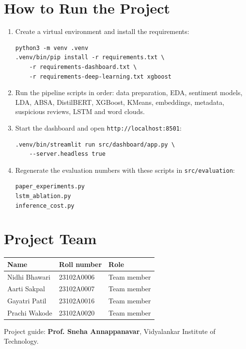 \documentclass[12pt,a4paper]{report}
\begin{document}
\chapter{How to Run the Project}
\begin{enumerate}
\item Create a virtual environment and install the requirements:
\begin{verbatim}
python3 -m venv .venv
.venv/bin/pip install -r requirements.txt \
    -r requirements-dashboard.txt \
    -r requirements-deep-learning.txt xgboost
\end{verbatim}
\item Run the pipeline scripts in order: data preparation, EDA, sentiment models, LDA, ABSA, DistilBERT, XGBoost, KMeans, embeddings, metadata, suspicious reviews, LSTM and word clouds.
\item Start the dashboard and open \texttt{http://localhost:8501}:
\begin{verbatim}
.venv/bin/streamlit run src/dashboard/app.py \
    --server.headless true
\end{verbatim}
\item Regenerate the evaluation numbers with these scripts in \texttt{src/evaluation}:
\begin{verbatim}
paper_experiments.py
lstm_ablation.py
inference_cost.py
\end{verbatim}
\end{enumerate}

\chapter{Project Team}
\begin{center}
\begin{tabular}{llp{6cm}}
\toprule
Name & Roll number & Role \\
\midrule
Nidhi Bhawari & 23102A0006 & Team member \\
Aarti Sakpal & 23102A0007 & Team member \\
Gayatri Patil & 23102A0016 & Team member \\
Prachi Wakode & 23102A0020 & Team member \\
\bottomrule
\end{tabular}
\end{center}
\noindent Project guide: \textbf{Prof. Sneha Annappanavar}, Vidyalankar Institute of Technology.
\end{document}
